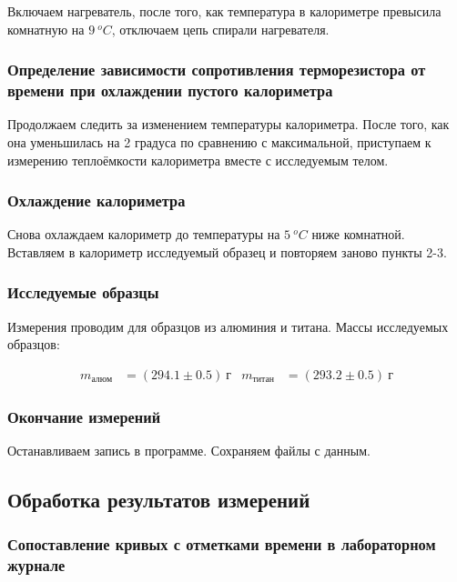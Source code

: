 \documentclass[a4paper, 12pt]{article}
\begin{document}
                Включаем нагреватель, после того, как температура в калориметре превысила комнатную на $9~^oC$, отключаем цепь спирали нагревателя.

            \subsubsection{Определение зависимости сопротивления терморезистора от времени при охлаждении пустого калориметра}

                Продолжаем следить за изменением температуры калориметра. После того, как она уменьшилась на 2 градуса по сравнению с максимальной, приступаем к измерению теплоёмкости калориметра вместе с исследуемым телом.

            \subsubsection{Охлаждение калориметра}

                Снова охлаждаем калориметр до температуры на $5~^oC$ ниже комнатной. Вставляем в калориметр исследуемый образец и повторяем заново пункты 2-3.

            \subsubsection{Исследуемые образцы}

                Измерения проводим для образцов из алюминия и титана. Массы исследуемых образцов:

                \begin{align*}
                    m_{алюм} &= (294.1 \pm 0.5)~г & m_{титан} &= (293.2 \pm 0.5)~г
                \end{align*}

            \subsubsection{Окончание измерений}

                Останавливаем запись в программе. Сохраняем файлы с данным.

        \subsection{Обработка результатов измерений}

            \subsubsection{Сопоставление кривых с отметками времени в лабораторном журнале}
\end{document}
